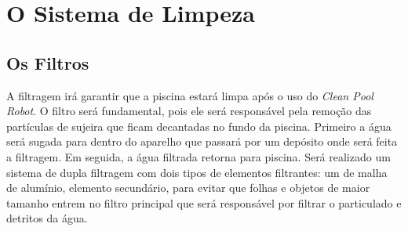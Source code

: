 \section{O Sistema de Limpeza}
\subsection{Os Filtros}
A filtragem irá garantir que a piscina estará limpa após o uso do \textit{Clean Pool Robot}. O filtro será fundamental, pois ele será responsável pela remoção das partículas de sujeira que ficam decantadas no fundo da piscina. Primeiro a água será sugada para dentro do aparelho que passará por um depósito onde será feita a filtragem. Em seguida, a água filtrada retorna para piscina. Será realizado um sistema de dupla filtragem com dois tipos de elementos filtrantes: um de malha de alumínio, elemento secundário, para evitar que folhas e objetos de maior tamanho entrem no filtro principal que será responsável por filtrar o particulado e detritos da água.

